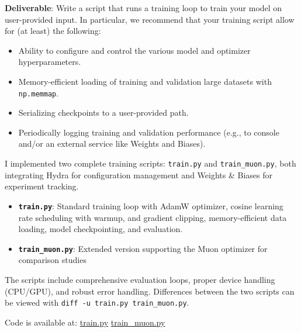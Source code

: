 
\textbf{Deliverable}: Write a script that runs a training loop to train your model on user-provided input. In particular, we recommend that your training script allow for (at least) the following:

\begin{itemize}
    \item Ability to configure and control the various model and optimizer hyperparameters.
    \item Memory-efficient loading of training and validation large datasets with \lstinline{np.memmap}.
    \item Serializing checkpoints to a user-provided path.
    \item Periodically logging training and validation performance (e.g., to console and/or an external service like Weights and Biases).
\end{itemize}

\begin{answer}
I implemented two complete training scripts: \lstinline{train.py} and \lstinline{train_muon.py}, both integrating Hydra for configuration management and Weights \& Biases for experiment tracking.

\begin{itemize}
    \item \textbf{\lstinline{train.py}}: Standard training loop with AdamW optimizer, cosine learning rate scheduling with warmup, and gradient clipping, memory-efficient data loading, model checkpointing, and evaluation.
    \item \textbf{\lstinline{train_muon.py}}: Extended version supporting the Muon optimizer for comparison studies
\end{itemize}

The scripts include comprehensive evaluation loops, proper device handling (CPU/GPU), and robust error handling. Differences between the two scripts can be viewed with \lstinline{diff -u train.py train_muon.py}.

Code is available at:
\href{https://github.com/donglinkang2021/cs336-assignment1-basics/blob/main/train.py}{train.py} 
\href{https://github.com/donglinkang2021/cs336-assignment1-basics/blob/main/train_muon.py}{train\_muon.py}

\end{answer}
